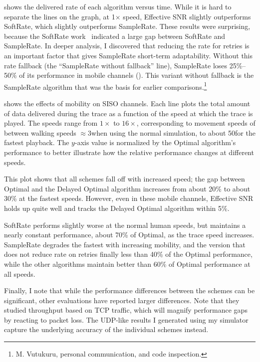  shows the delivered rate of each algorithm versus time. While it is hard to separate the lines on the graph, at 1$\times$ speed, Effective SNR slightly outperforms SoftRate, which slightly outperforms SampleRate. These results were surprising, because the SoftRate work~\cite{Vutukuru_SoftRate} indicated a large gap between SoftRate and SampleRate. In deeper analysis, I discovered that reducing the rate for retries is an important factor that gives SampleRate short-term adaptability. Without this rate fallback (the ``SampleRate without fallback'' line), SampleRate loses 25\%--50\% of its performance in mobile channels (). This variant without fallback is the SampleRate algorithm that was the basis for earlier comparisons.\footnote{M. Vutukuru, personal communication, and code inspection.}

 shows the effects of mobility on SISO channels. Each line plots the total amount of data delivered during the trace as a function of the speed at which the trace is played. The speeds range from $1\times$ to $16\times$, corresponding to movement speeds of between walking speeds $\approx$3\mph when using the normal simulation, to about 50\mph for the fastest playback. The $y$-axis value is normalized by the Optimal algorithm's performance to better illustrate how the relative performance changes at different speeds.

This plot shows that all schemes fall off with increased speed; the gap between Optimal and the Delayed Optimal algorithm increases from about 20\% to about 30\% at the fastest speeds. However, even in these mobile channels, Effective SNR holds up quite well and tracks the Delayed Optimal algorithm within 5\%.

SoftRate performs slightly worse at the normal human speeds, but maintains a nearly constant performance, about 70\% of Optimal, as the trace speed increases. SampleRate degrades the fastest with increasing mobility, and the version that does not reduce rate on retries finally less than 40\% of the Optimal performance, while the other algorithms maintain better than 60\% of Optimal performance at all speeds.

Finally, I note that while the performance differences between the schemes can be significant, other evaluations have reported larger differences. Note that they studied throughput based on TCP traffic, which will magnify performance gaps by reacting to packet loss. The UDP-like results I generated using my simulator capture the underlying accuracy of the individual schemes instead.

